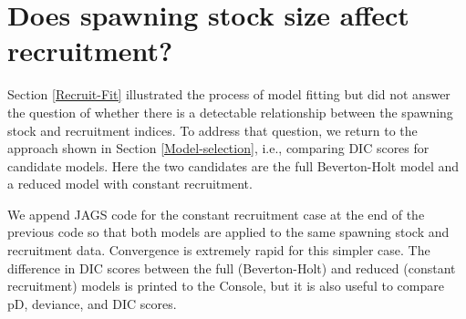 \documentclass[
]{krantz}
\begin{document}
\hypertarget{Recruit-DIC}{%
\section{Does spawning stock size affect recruitment?}\label{Recruit-DIC}}

Section \ref{Recruit-Fit} illustrated the process of model fitting but did not answer the question of whether there is a detectable relationship between the spawning stock and recruitment indices. To address that question, we return to the approach shown in Section \ref{Model-selection}, i.e., comparing DIC scores for candidate models. Here the two candidates are the full Beverton-Holt model and a reduced model with constant recruitment.

We append JAGS code for the constant recruitment case at the end of the previous code so that both models are applied to the same spawning stock and recruitment data. Convergence is extremely rapid for this simpler case. The difference in DIC scores between the full (Beverton-Holt) and reduced (constant recruitment) models is printed to the Console, but it is also useful to compare pD, deviance, and DIC scores.
\end{document}
